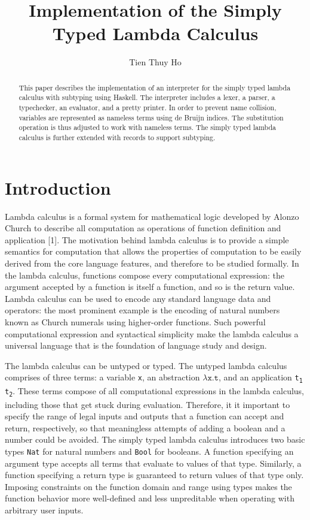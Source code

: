 \documentclass[fleqn, 11pt]{article}
\title{\bf Implementation of the Simply Typed Lambda Calculus}
\author{Tien Thuy Ho}
\begin{document}
\maketitle

\begin{abstract}
This paper describes the implementation of an interpreter for the simply typed lambda calculus with subtyping using Haskell. The interpreter 
includes a lexer, a parser, a typechecker, an evaluator, and a pretty printer. In order to prevent name collision, variables are represented 
as nameless terms using de Bruijn indices. The substitution operation is thus adjusted to work with nameless terms. The simply typed 
lambda calculus is further extended with records to support subtyping.
\end{abstract}

\section{Introduction}

Lambda calculus is a formal system for mathematical logic developed by Alonzo Church to describe all computation as operations of 
function definition and application [1]. The motivation behind lambda calculus is to provide a simple semantics for computation that allows 
the properties of computation to be easily derived from the core language features, and therefore to be studied formally. In the lambda 
calculus, functions compose every computational expression: the argument accepted by a function is itself a function, and so is the return 
value. Lambda calculus can be used to encode any standard language data and operators: the most prominent example is the encoding of 
natural numbers known as Church numerals using higher-order functions. Such powerful computational expression and syntactical simplicity 
make the lambda calculus a universal language that is the foundation of language study and design. 

The lambda calculus can be untyped or typed. The untyped lambda calculus comprises of three terms: a variable \texttt{x}, an abstraction 
$\lambda \texttt{x.t}$, and an application \texttt{t\textsubscript{1} t\textsubscript{2}}. These terms compose of all computational 
expressions in the lambda calculus, including those that get stuck during evaluation. Therefore, it it important to specify the range of legal inputs and outputs that a function can 
accept and return, respectively, so that meaningless attempts of adding a boolean and a number could be avoided. The simply typed lambda calculus 
introduces two basic types \texttt{Nat} for natural numbers and \texttt{Bool} for booleans. A function specifying an argument type accepts 
all terms that evaluate to values of that type. Similarly, a function specifying a return type is guaranteed to return values of that type 
only. Imposing constraints on the function domain and range using types makes the function behavior more well-defined and less unpreditable 
when operating with arbitrary user inputs.
\end{document}
